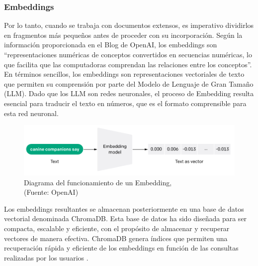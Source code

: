 \subsubsection{Embeddings}



\par Por lo tanto, cuando se trabaja con documentos extensos, es imperativo dividirlos en fragmentos más pequeños antes de proceder 
con su incorporación. Según la información proporcionada en el Blog de OpenAI, los embeddings son ``representaciones numéricas 
de conceptos convertidos en secuencias numéricas, lo que facilita que las computadoras comprendan las relaciones entre los 
conceptos''\cite{openai1}. En términos sencillos, los embeddings son representaciones vectoriales de texto que permiten su comprensión por 
parte del Modelo de Lenguaje de Gran Tamaño (LLM). Dado que los LLM son redes neuronales, el proceso de Embedding resulta 
esencial para traducir el texto en números, que es el formato comprensible para esta red neuronal.

\begin{figure}[ht!]
    \centering
    \includegraphics[width=.7\textwidth]{figures/huemul4.png}
    \caption[Diagrama del funcionamiento de un Embedding]{Diagrama del funcionamiento de un Embedding,\\
    {\scriptsize (Fuente: OpenAI\cite{openai1})}}
    \label{fig:chatbot1}
\end{figure}

\par Los embeddings resultantes se almacenan posteriormente en una base de datos vectorial denominada ChromaDB. Esta base de 
datos ha sido diseñada para ser compacta, escalable y eficiente, con el propósito de almacenar y recuperar vectores de manera 
efectiva. ChromaDB genera índices que permiten una recuperación rápida y eficiente de los embeddings en función de las 
consultas realizadas por los usuarios \cite{langchain1}.


